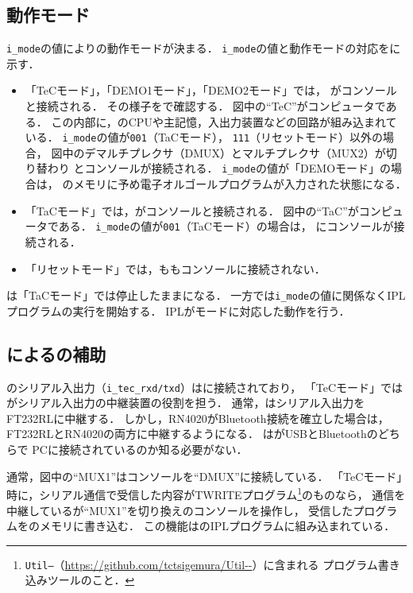 \subsection{動作モード}
\label{tec7mode}
\texttt{i\_mode}の値により{\tecS}の動作モードが決まる．
\texttt{i\_mode}の値と動作モードの対応をに示す．

\begin{itemize}
\item 「TeCモード」，「DEMO1モード」，「DEMO2モード」では，
  {\tec}がコンソールと接続される．
  その様子をで確認する．
  図中の``TeC''が{\tec}コンピュータである．
  この内部に，{\tec}のCPUや主記憶，入出力装置などの回路が組み込まれている．
  \texttt{i\_mode}の値が\texttt{001}（TaCモード），
  \texttt{111}（リセットモード）以外の場合，
  図中のデマルチプレクサ（DMUX）とマルチプレクサ（MUX2）が切り替わり
  {\tec}とコンソールが接続される．
  \texttt{i\_mode}の値が「DEMOモード」の場合は，
  {\tec}のメモリに予め電子オルゴールプログラムが入力された状態になる．
\item 「TaCモード」では，{\tac}がコンソールと接続される．
  図中の``TaC''が{\tac}コンピュータである．
  \texttt{i\_mode}の値が\texttt{001}（TaCモード）の場合は，
  {\tac}にコンソールが接続される．
\item 「リセットモード」では，{\tec}も{\tac}もコンソールに接続されない．
\end{itemize}

{\tec}は「TaCモード」では停止したままになる．
一方で{\tac}は\texttt{i\_mode}の値に関係なくIPLプログラムの実行を開始する．
IPLがモードに対応した動作を行う．

\subsection{{\tac}による{\tec}の補助}
\label{tec7assist}
{\tec}のシリアル入出力（\texttt{i\_tec\_rxd/txd}）は{\tac}に接続されており，
「TeCモード」では{\tac}がシリアル入出力の中継装置の役割を担う．
通常，{\tac}はシリアル入出力をFT232RLに中継する．
しかし，RN4020がBluetooth接続を確立した場合は，
FT232RLとRN4020の両方に中継するようになる．
{\tec}は{\tecS}がUSBとBluetoothのどちらで
PCに接続されているのか知る必要がない．

通常，図中の``MUX1''はコンソールを``DMUX''に接続している．
「TeCモード」時に，シリアル通信で受信した内容がTWRITEプログラム\footnote{
\texttt{Util--}（\url{https://github.com/tctsigemura/Util--}）に含まれる
プログラム書き込みツールのこと．}のものなら，
通信を中継している{\tac}が``MUX1''を切り換え{\tec}のコンソールを操作し，
受信したプログラムを{\tec}のメモリに書き込む．
この機能は{\tac}のIPLプログラムに組み込まれている．

